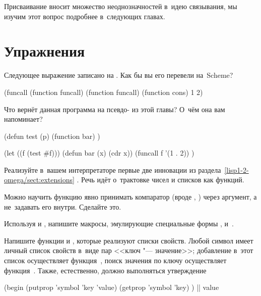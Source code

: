 Присваивание вносит множество неоднозначностей в~идею связывания, мы изучим этот
вопрос подробнее в~следующих главах.


\section{Упражнения}\label{lisp1-2-omega/sect:exercises}

\begin{exercise}\label{lisp1-2-omega/ex:funcall}
Следующее выражение записано на {\CommonLisp}. Как бы вы его перевели на~Scheme?

\begin{code:lisp}
(funcall (function funcall) (function funcall) (function cons) 1 2)
\end{code:lisp}
\end{exercise}

\begin{exercise}\label{lisp1-2-omega/ex:lexical}
Что вернёт данная программа на псевдо-{\CommonLisp} из этой главы?
О~чём она вам напоминает?

\begin{code:lisp}
(defun test (p)
  (function bar) )

(let ((f (test #f)))
  (defun bar (x) (cdr x))
  (funcall f '(1 . 2)) )
\end{code:lisp}
\end{exercise}

\begin{exercise}\label{lisp1-2-omega/ex:innovations}
Реализуйте в~вашем интерпретаторе первые две инновации из
раздела~\ref{lisp1-2-omega/sect:extensions}
. Речь идёт о~трактовке чисел и
списков как функций.
\end{exercise}

\begin{exercise}\label{lisp1-2-omega/ex:assoc-with-comparator}
Можно научить функцию  явно принимать компаратор (вроде ,
 {\itp}) через аргумент, а не~задавать его внутри. Сделайте это.
\end{exercise}

\begin{exercise}\label{lisp1-2-omega/ex:dynamic}
Используя  и , напишите макросы, эмулирующие
специальные формы ,  и~.
\end{exercise}

\begin{exercise}\label{lisp1-2-omega/ex:write-put/get-prop}
Напишите функции  и , которые реализуют списки свойств.
Любой символ имеет личный список свойств в~виде пар <<ключ "--- значение>>;
добавление в~этот список осуществляет функция~, поиск значения по
ключу осуществляет функция~. Также, естественно, должно выполняться
утверждение

\begin{code:lisp}
(begin (putprop 'symbol 'key 'value)
       (getprop 'symbol 'key) )      |\is| value
\end{code:lisp}
\end{exercise}

